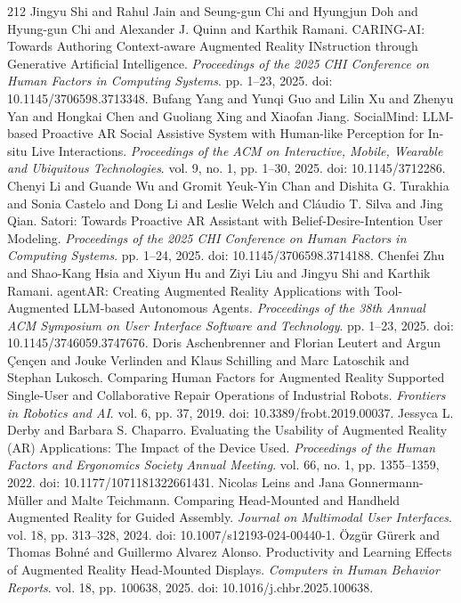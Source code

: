 \begin{thebibliography}{212}
 Jingyu Shi and Rahul Jain and Seung-gun Chi and Hyungjun Doh and Hyung-gun Chi and Alexander J. Quinn and Karthik Ramani. {CARING-AI}: Towards Authoring Context-aware Augmented Reality INstruction through Generative Artificial Intelligence. \emph{Proceedings of the 2025 CHI Conference on Human Factors in Computing Systems}. pp. 1--23, 2025. doi: 10.1145/3706598.3713348.
 Bufang Yang and Yunqi Guo and Lilin Xu and Zhenyu Yan and Hongkai Chen and Guoliang Xing and Xiaofan Jiang. {SocialMind}: {LLM}-based Proactive {AR} Social Assistive System with Human-like Perception for In-situ Live Interactions. \emph{Proceedings of the ACM on Interactive, Mobile, Wearable and Ubiquitous Technologies}. vol. 9, no. 1, pp. 1--30, 2025. doi: 10.1145/3712286.
 Chenyi Li and Guande Wu and Gromit Yeuk-Yin Chan and Dishita G. Turakhia and Sonia Castelo and Dong Li and Leslie Welch and Cl{\'a}udio T. Silva and Jing Qian. Satori: Towards Proactive {AR} Assistant with Belief-Desire-Intention User Modeling. \emph{Proceedings of the 2025 CHI Conference on Human Factors in Computing Systems}. pp. 1--24, 2025. doi: 10.1145/3706598.3714188.
 Chenfei Zhu and Shao-Kang Hsia and Xiyun Hu and Ziyi Liu and Jingyu Shi and Karthik Ramani. {agentAR}: Creating Augmented Reality Applications with Tool-Augmented {LLM}-based Autonomous Agents. \emph{Proceedings of the 38th Annual ACM Symposium on User Interface Software and Technology}. pp. 1--23, 2025. doi: 10.1145/3746059.3747676.
 Doris Aschenbrenner and Florian Leutert and Argun {\c{C}}en{\c{c}}en and Jouke Verlinden and Klaus Schilling and Marc Latoschik and Stephan Lukosch. Comparing Human Factors for Augmented Reality Supported Single-User and Collaborative Repair Operations of Industrial Robots. \emph{Frontiers in Robotics and AI}. vol. 6, pp. 37, 2019. doi: 10.3389/frobt.2019.00037.
 Jessyca L. Derby and Barbara S. Chaparro. Evaluating the Usability of Augmented Reality ({AR}) Applications: The Impact of the Device Used. \emph{Proceedings of the Human Factors and Ergonomics Society Annual Meeting}. vol. 66, no. 1, pp. 1355--1359, 2022. doi: 10.1177/1071181322661431.
 Nicolas Leins and Jana Gonnermann-M{\"u}ller and Malte Teichmann. Comparing Head-Mounted and Handheld Augmented Reality for Guided Assembly. \emph{Journal on Multimodal User Interfaces}. vol. 18, pp. 313--328, 2024. doi: 10.1007/s12193-024-00440-1.
 {\"O}zg{\"u}r G{\"u}rerk and Thomas Bohn{\'e} and Guillermo Alvarez Alonso. Productivity and Learning Effects of Augmented Reality Head-Mounted Displays. \emph{Computers in Human Behavior Reports}. vol. 18, pp. 100638, 2025. doi: 10.1016/j.chbr.2025.100638.

\end{thebibliography}
